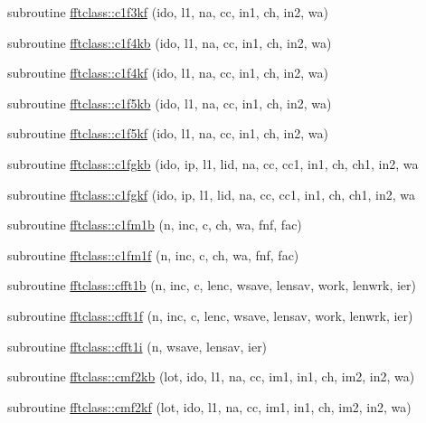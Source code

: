 \begin{DoxyCompactItemize}
\item 
subroutine \mbox{\hyperlink{namespacefftclass_ae586c2f39848274e0454c7d161522c31}{fftclass\+::c1f3kf}} (ido, l1, na, cc, in1, ch, in2, wa)
\item 
subroutine \mbox{\hyperlink{namespacefftclass_a16b67c4056cd4bef03d70d6289f60954}{fftclass\+::c1f4kb}} (ido, l1, na, cc, in1, ch, in2, wa)
\item 
subroutine \mbox{\hyperlink{namespacefftclass_a4121c0b7de23d7df058852fb75a9a31a}{fftclass\+::c1f4kf}} (ido, l1, na, cc, in1, ch, in2, wa)
\item 
subroutine \mbox{\hyperlink{namespacefftclass_aa356856107611ad66966fed70ede74f1}{fftclass\+::c1f5kb}} (ido, l1, na, cc, in1, ch, in2, wa)
\item 
subroutine \mbox{\hyperlink{namespacefftclass_a21d2647f4c2392ed5498288f99a3203c}{fftclass\+::c1f5kf}} (ido, l1, na, cc, in1, ch, in2, wa)
\item 
subroutine \mbox{\hyperlink{namespacefftclass_af3a0a7ee1c2b801d9ff55c016cdc13f4}{fftclass\+::c1fgkb}} (ido, ip, l1, lid, na, cc, cc1, in1, ch, ch1, in2, wa
\item 
subroutine \mbox{\hyperlink{namespacefftclass_aa48f7f35412e5994c6fe459ad6f8c46d}{fftclass\+::c1fgkf}} (ido, ip, l1, lid, na, cc, cc1, in1, ch, ch1, in2, wa
\item 
subroutine \mbox{\hyperlink{namespacefftclass_a2f5368919279e1986ee34764caa05fe0}{fftclass\+::c1fm1b}} (n, inc, c, ch, wa, fnf, fac)
\item 
subroutine \mbox{\hyperlink{namespacefftclass_a8870afa6b2bab24460d719026aa6e0d8}{fftclass\+::c1fm1f}} (n, inc, c, ch, wa, fnf, fac)
\item 
subroutine \mbox{\hyperlink{namespacefftclass_acc0dd0d3644e3ff67fd2dfb23dcb4e40}{fftclass\+::cfft1b}} (n, inc, c, lenc, wsave, lensav, work, lenwrk, ier)
\item 
subroutine \mbox{\hyperlink{namespacefftclass_a4cc16a9191f915424a42d281f821c291}{fftclass\+::cfft1f}} (n, inc, c, lenc, wsave, lensav, work, lenwrk, ier)
\item 
subroutine \mbox{\hyperlink{namespacefftclass_a7aaa42c1b45fc7175f2560cd023e4487}{fftclass\+::cfft1i}} (n, wsave, lensav, ier)
\item 
subroutine \mbox{\hyperlink{namespacefftclass_a718a5d0ac7052a9bcbcb9db18430dd61}{fftclass\+::cmf2kb}} (lot, ido, l1, na, cc, im1, in1, ch, im2, in2, wa)
\item 
subroutine \mbox{\hyperlink{namespacefftclass_a87e04f91c6fd5a8be5cce797b134f4c3}{fftclass\+::cmf2kf}} (lot, ido, l1, na, cc, im1, in1, ch, im2, in2, wa)

\end{DoxyCompactItemize}
